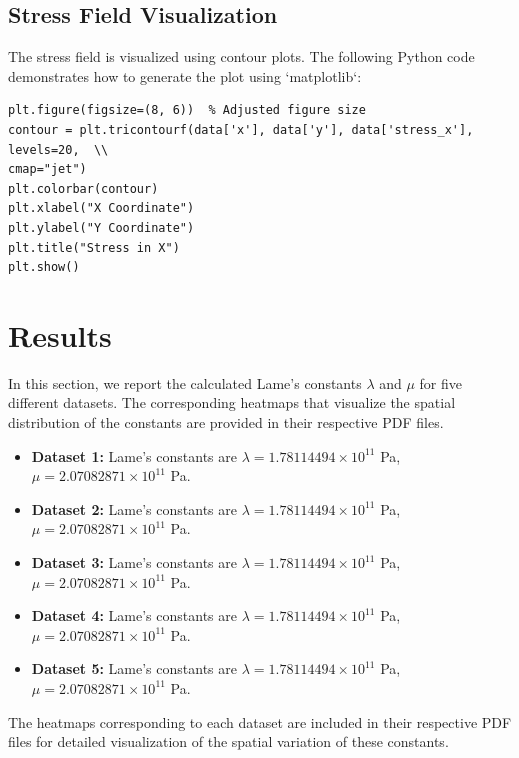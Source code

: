 \documentclass[fleqn,10pt]{olplainarticle}
\begin{document}
\subsection{Stress Field Visualization}
The stress field is visualized using contour plots. The following Python code demonstrates how to generate the plot using `matplotlib`:

\begin{verbatim}
plt.figure(figsize=(8, 6))  % Adjusted figure size
contour = plt.tricontourf(data['x'], data['y'], data['stress_x'], levels=20,  \\
cmap="jet")
plt.colorbar(contour)
plt.xlabel("X Coordinate")
plt.ylabel("Y Coordinate")
plt.title("Stress in X")
plt.show()
\end{verbatim}



\section{Results}

In this section, we report the calculated Lame's constants \( \lambda \) and \( \mu \) for five different datasets. The corresponding heatmaps that visualize the spatial distribution of the constants are provided in their respective PDF files.

\begin{itemize}
    \item \textbf{Dataset 1:} Lame's constants are \( \lambda = 1.78114494 \times 10^{11} \) Pa, \( \mu = 2.07082871 \times 10^{11} \) Pa.
    \item \textbf{Dataset 2:} Lame's constants are \( \lambda = 1.78114494 \times 10^{11} \) Pa, \( \mu = 2.07082871 \times 10^{11} \) Pa.
    \item \textbf{Dataset 3:} Lame's constants are \( \lambda = 1.78114494 \times 10^{11} \) Pa, \( \mu = 2.07082871 \times 10^{11} \) Pa.
    \item \textbf{Dataset 4:} Lame's constants are \( \lambda = 1.78114494 \times 10^{11} \) Pa, \( \mu = 2.07082871 \times 10^{11} \) Pa.
    \item \textbf{Dataset 5:} Lame's constants are \( \lambda = 1.78114494 \times 10^{11} \) Pa, \( \mu = 2.07082871 \times 10^{11} \) Pa.
\end{itemize}

The heatmaps corresponding to each dataset are included in their respective PDF files for detailed visualization of the spatial variation of these constants.
\end{document}
